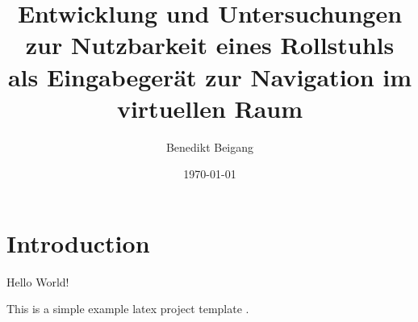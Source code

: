 \documentclass{report}
\title{Entwicklung und Untersuchungen zur Nutzbarkeit eines Rollstuhls als Eingabegerät zur Navigation im virtuellen Raum}
\author{Benedikt Beigang}
\date{\today}
\begin{document}
\maketitle

\section{Introduction}

Hello World!
\cite{doernerVirtualUndAugmented2019}

This is a simple example latex project template \cite{latex-project-template}.



\end{document}
